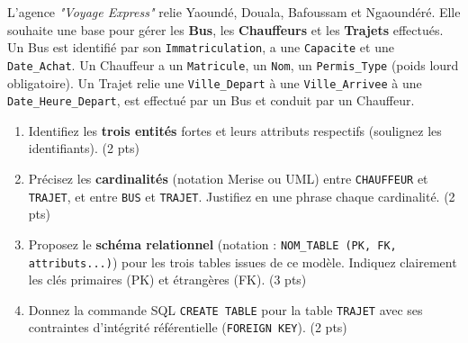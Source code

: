 \documentclass[11pt]{article}
\begin{document}
\begin{exercice}
L'agence \textit{"Voyage Express"} relie Yaoundé, Douala, Bafoussam et Ngaoundéré. Elle souhaite une base pour gérer les \textbf{Bus}, les \textbf{Chauffeurs} et les \textbf{Trajets} effectués.
Un Bus est identifié par son \texttt{Immatriculation}, a une \texttt{Capacite} et une \texttt{Date\_Achat}.
Un Chauffeur a un \texttt{Matricule}, un \texttt{Nom}, un \texttt{Permis\_Type} (poids lourd obligatoire).
Un Trajet relie une \texttt{Ville\_Depart} à une \texttt{Ville\_Arrivee} à une \texttt{Date\_Heure\_Depart}, est effectué par un Bus et conduit par un Chauffeur.
\begin{enumerate}
    \item Identifiez les \textbf{trois entités} fortes et leurs attributs respectifs (soulignez les identifiants). (2 pts)
    \item Précisez les \textbf{cardinalités} (notation Merise ou UML) entre \texttt{CHAUFFEUR} et \texttt{TRAJET}, et entre \texttt{BUS} et \texttt{TRAJET}. Justifiez en une phrase chaque cardinalité. (2 pts)
    \item Proposez le \textbf{schéma relationnel} (notation : \texttt{NOM\_TABLE (PK, FK, attributs...)}) pour les trois tables issues de ce modèle. Indiquez clairement les clés primaires (PK) et étrangères (FK). (3 pts)
    \item Donnez la commande SQL \texttt{CREATE TABLE} pour la table \texttt{TRAJET} avec ses contraintes d'intégrité référentielle (\texttt{FOREIGN KEY}). (2 pts)
\end{enumerate}
\end{exercice}
\end{document}
